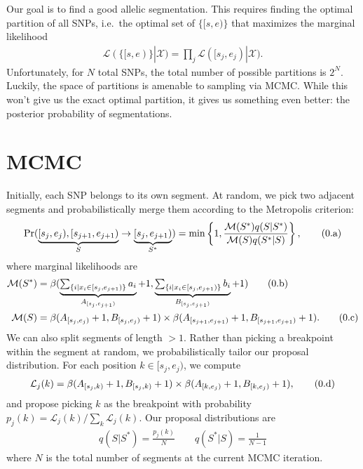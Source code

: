 \documentclass[10pt,letter]{article}
\numberwithin{equation}{section}
\newcommand{\rt}{\right}
\newcommand{\lt}{\left}
\newcommand{\btag}[1]{\addtocounter{equation}{1}\label{#1}\tag{\arabic{section}.\alph{equation}}}
\newcommand{\textop}[1]{\operatorname{#1}}
\begin{document}
Our goal is to find a good allelic segmentation. This requires finding the optimal partition of all SNPs, i.e.\ the optimal set of $\{[s,e)\}$ that maximizes the marginal likelihood
\begin{align*}
\mathcal{L}(\{[s,e)\}|\mathcal{X})=\prod_j \mathcal{L}([s_j,e_j)|\mathcal{X}).
\end{align*}
Unfortunately, for $N$ total SNPs, the total number of possible partitions is $2^N$. Luckily, the space of partitions is amenable to sampling via MCMC. While this won't give us the exact optimal partition, it gives us something even better: the posterior probability of segmentations.

\section{MCMC}
\label{MCMC_section}

Initially, each SNP belongs to its own segment. At random, we pick two adjacent segments and probabilistically merge them according to the Metropolis criterion:
\begin{align*}
\textop{Pr}(\underbrace{[s_j,e_j),[s_{j+1},e_{j+1})}_{S}\to \underbrace{[s_j,e_{j+1})}_{S^\ast}) = \min\lt\{1,\frac{\mathcal{M}(S^\ast)q(S|S^\ast)}{\mathcal{M}(S)q(S^\ast|S)}\rt\},\btag{metro}
\end{align*}
where marginal likelihoods are
\begin{align*}
\mathcal{M}(S^\ast) &= \beta(\underbrace{\textstyle\sum_{\{i|x_i\in [s_j, e_{j+1})\}}a_i}_{A_{[s_j,e_{j+1})}}+1,\underbrace{\textstyle\sum_{\{i|x_i\in [s_j, e_{j+1})\}}b_i}_{B_{[s_j,e_{j+1})}}+1)\btag{psum_1}\\
\mathcal{M}(S) &= \beta(A_{[s_j,e_j)}+1,B_{[s_j,e_j)}+1)\times \beta(A_{[s_{j+1},e_{j+1})}+1,B_{[s_{j+1},e_{j+1})}+1).\btag{psum_2}
\end{align*}
We can also split segments of length $>1$. Rather than picking a breakpoint within the segment at random, we probabilistically tailor our proposal distribution. For each position $k\in [s_j,e_j)$, we compute
\begin{align*}
\mathcal{L}_j(k) = \beta(A_{[s_j,k)}+1,B_{[s_j,k)}+1)\times\beta(A_{[k,e_j)}+1,B_{[k,e_j)}+1),\btag{psum_3}
\end{align*}
and propose picking $k$ as the breakpoint with probability $p_j(k)=\mathcal{L}_j(k)/\sum_k \mathcal{L}_j(k)$. Our proposal distributions are
\begin{align*}
q(S|S^\ast) = \frac{p_j(k)}{N} \qquad q(S^\ast|S) = \frac{1}{N-1}
\end{align*}
where $N$ is the total number of segments at the current MCMC iteration.
\end{document}
